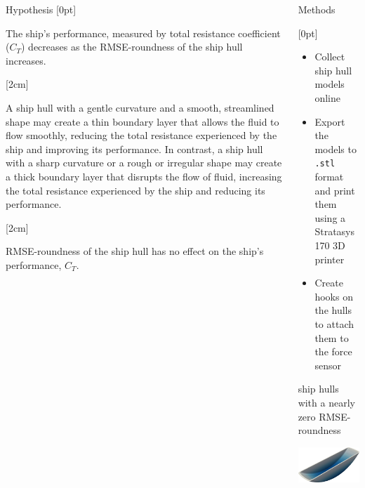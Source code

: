 \documentclass[final, 20pt]{beamer}
\newlength{\colwidth}
\newlength{\twocolwidth}
\begin{document}
\begin{frame}[t]
\begin{columns}[t]
\begin{column}{\colwidth}
      \begin{block}{Hypothesis}
        [0pt]

        The ship's performance, measured by total resistance coefficient ($C_T$) decreases as the RMSE-roundness of the ship hull increases.

        [2cm]

        A ship hull with a gentle curvature and a smooth, streamlined shape may create a thin boundary layer that allows the fluid to flow smoothly, reducing the total resistance experienced by the ship and improving its performance. In contrast, a ship hull with a sharp curvature or a rough or irregular shape may create a thick boundary layer that disrupts the flow of fluid, increasing the total resistance experienced by the ship and reducing its performance.

        [2cm]

        RMSE-roundness of the ship hull has no effect on the ship’s performance, $C_T$.
      \end{block}
    \end{column}

    \separatorcolumn

    \begin{column}{\twocolwidth}
      \begin{block}{Methods}

        \setlength{\columnsep}{2em}
        \begin{multicols}{2}
          [0pt]

          \begin{itemize}
            \item Collect ship hull models online
            \item Export the models to \texttt{.stl} format and print them using a Stratasys 170 3D printer
            \item Create hooks on the hulls to attach them to the force sensor
          \end{itemize}

          \begin{minipage}[t]{0.48\linewidth}

            ship hulls with a nearly zero RMSE-roundness

            \centering
            \includegraphics[width=0.4\linewidth]{images/control.png}
          \end{minipage}{\hspace*{0.75em}\color{theme-2!50}\vline\hspace*{0.5em}}
          \begin{minipage}[t]{0.48\linewidth}


\end{minipage}
\end{multicols}
\end{block}
\end{column}
\end{columns}
\end{frame}
\end{document}
